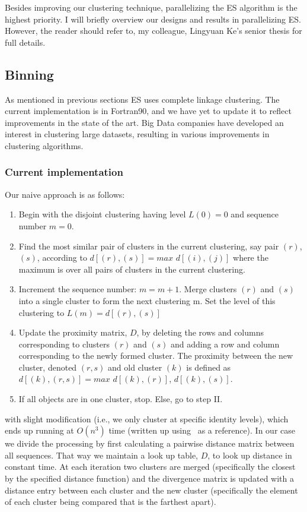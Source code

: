 Besides improving our clustering technique, parallelizing the ES algorithm is the highest priority.
I will briefly overview our designs and results in parallelizing ES.
However, the reader should refer to, my colleague, Lingyuan Ke's senior thesis for full details.
\subsection*{Binning}
As mentioned in previous sections ES uses complete linkage clustering.
The current implementation is in Fortran90, and we have yet to update it to reflect improvements in the state of the art.
Big Data companies have developed an interest in clustering large datasets, resulting in various improvements in clustering algorithms.
\subsubsection*{Current implementation}
Our naive approach is as follows:
\begin{enumerate}[I]
\item Begin with the disjoint clustering having level $L(0) = 0$ and sequence number $m = 0$.
\item Find the most similar pair of clusters in the current clustering, say pair $(r)$, $(s)$, according to $d[(r),(s)] = max$ $d[(i),(j)]$ where the maximum is over all pairs of clusters in the current clustering.
\item Increment the sequence number: $m = m + 1$. Merge clusters $(r)$ and $(s)$ into a single cluster to form the next clustering m. Set the level of this clustering to $L(m) = d[(r),(s)]$
\item Update the proximity matrix, $D$, by deleting the rows and columns corresponding to clusters $(r)$ and $(s)$ and adding a row and column corresponding to the newly formed cluster. The proximity between the new cluster, denoted $(r,s)$ and old cluster $(k)$ is defined as $d[(k), (r,s)] = max$ $d[(k),(r)]$, $d[(k),(s)]$.
\item If all objects are in one cluster, stop. Else, go to step II.
\end{enumerate}
with slight modification (i.e., we only cluster at specific identity levels), which ends up running at $O(n^3)$ time (written up using~\cite{FastClust} as a reference).
In our case we divide the processing by first calculating a pairwise distance matrix between all sequences.
That way we maintain a look up table, $D$, to look up distance in constant time.
At each iteration two clusters are merged (specifically the closest by the specified distance function) and the divergence matrix is updated with a distance entry between each cluster and the new cluster (specifically the element of each cluster being compared that is the farthest apart).


